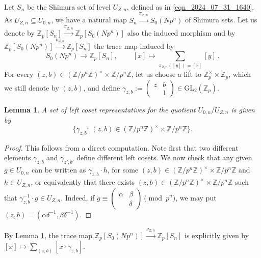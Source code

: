 \documentclass{amsart}
\numberwithin{equation}{section}
\newtheorem{lemma}[theorem]{Lemma}
\newcommand{\bb}{\mathbb}
\newcommand{\Zp}{\mathbb{Z}_p}
\newcommand{\ZZ}{\mathbb{Z}}
\newcommand{\GL}{\mathrm{GL}}
\newcommand{\lra}{\longrightarrow}
\begin{document}
Let $S_n$ be the Shimura set of level $U_{Z,n}$, defined as in \eqref{eqn_2024_07_31_1640}. As $U_{Z,n} \subseteq U_{0,n}$, we have a natural map $S_n \xrightarrow{\pi_{Z,n}} S_0(Np^n)$ of Shimura sets. Let us denote by $\Zp[S_n] \xrightarrow{\pi_{Z,n}} \Zp[S_0(Np^n)]$ also the induced morphism and by $\Zp[S_0(Np^n)] \xrightarrow{\nu_{Z,n}} \Zp[S_n]$ the trace map induced by 
$$ S_0(Np^n) \lra \bb{Z}_p[S_n],\, \qquad [x] \mapsto \sum_{\pi_{Z,n}([y])=[x]} [y]\,.$$ For every $(z,b) \in (\ZZ/p^n \ZZ)^\times \times \ZZ/p^n \ZZ$, let us choose a lift to $ \Zp^\times \times \Zp$, which we still denote by $(z,b)$, and define $\gamma_{z,b} := \left( \begin{smallmatrix}
    z & b \\ & 1
\end{smallmatrix}\right) \in \GL_2(\Zp)$. 
\begin{lemma}\label{lemma_cosetdecomposition}
 A set of left coset representatives for the quotient $U_{0,n} / U_{Z,n}$ is given by \[\{ \gamma_{z,b}:\, (z,b) \in (\ZZ/p^n \ZZ)^\times \times \ZZ/p^n \ZZ\}.\]   
\end{lemma}
\begin{proof}
This follows from a direct computation. Note first that two different elements $\gamma_{z,b}$ and $\gamma_{z',b'}$ define different left cosets. We now check that any given $g \in U_{0,n}$ can be written as $\gamma_{z,b} \cdot h$, for some $(z,b) \in (\ZZ /p^n \ZZ)^\times \times \ZZ /p^n \ZZ$ and $h \in U_{Z,n}$, or equivalently that there exists $(z,b) \in (\ZZ /p^n \ZZ)^\times \times \ZZ /p^n \ZZ$ such that $\gamma_{z,b}^{-1} \cdot g \in U_{Z,n}$. Indeed, if $g \equiv \left( \begin{smallmatrix} \alpha & \beta \\ & \delta  \end{smallmatrix} \right)\pmod {p^n}$, we may put $(z,b) = (\alpha \delta^{-1},\beta \delta^{-1})$.
\end{proof}


\noindent By Lemma \ref{lemma_cosetdecomposition}, the trace map $\Zp[S_0(Np^n)] \xrightarrow{\nu_{Z,n}} \Zp[S_n]$ is explicitly given by $[x] \mapsto \sum_{(z,b)} [x \cdot \gamma_{z,b}]$. 
\end{document}
